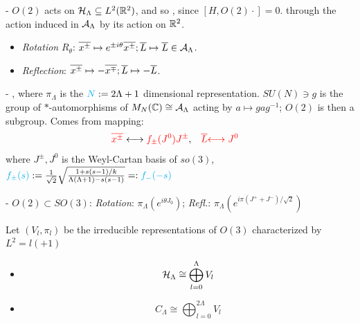 {
    \color{gray}
    
    - $O(2)$ acts on $\mathcal H_\Lambda \subseteq L^2(\mathbb{R}^2)$, and so , since $[H, O(2)\cdot ] = 0$. through the action induced in $\mathcal A_\Lambda$ by its action on $\mathbb{R}^2$.
        \begin{itemize}
            
        \item \textit{Rotation} $R_\theta$: $\overline{x^\pm} \mapsto e^{\pm i \theta} \overline{x ^\pm}; \overline{L} \mapsto \overline{L} \in \mathcal A_\Lambda$.
        
        \item \textit{Reflection}: $\overline{x^\pm} \mapsto -\overline{x^\mp}; \overline{L} \mapsto -\overline{L}$.
        
        \end{itemize}
    
    - , where $\pi_\Lambda$ is the $\textcolor{cyan}{N} := 2 \Lambda + 1$ dimensional representation. $SU(N) \ni g$ is the group of $*$-automorphisms of $M_N(\mathbb{C}) \cong \mathcal A_\Lambda$ acting by $a \mapsto g a g^{-1}$; $O(2)$ is then a subgroup. Comes from mapping:
    \begin{align}
        \textcolor{red}{\overline{x^\pm}} &\longleftrightarrow \textcolor{red}{f_\pm (J^0) J^\pm}, &
        \textcolor{red}{\overline{L} }& \textcolor{red}{\longleftrightarrow J^0}
    \end{align}
    where $J^\pm, J^0$ is the Weyl-Cartan basis of $so(3)$, $\textcolor{cyan}{f_\pm(s)} := \frac{1}{\sqrt{2}} \sqrt{\frac{1 + s(s-1)/k}{\Lambda (\Lambda + 1) - s(s-1)}} =: \textcolor{cyan}{f_-(-s)}$%

    - $O(2) \subset SO(3)$: \textit{Rotation}: $\pi_\Lambda(e^{i \theta J_0})$; \textit{Refl.}: $\pi_\Lambda(e^{i\pi (J^+ + J^-)/\sqrt{2}})$
    
    \lin 
    
    Let $(V_l, \pi_l)$ be the irreducible representations of $O(3)$ characterized by $L^2 = l(+1)$
    
        \begin{itemize}
        
        \item  \begin{equation}
            \mathcal H_\Lambda \cong \bigoplus_{l = 0}^\Lambda V_l
        \end{equation}
        
        \item \begin{equation}
            C_\Lambda \cong \bigoplus_{l = 0}^{2\Lambda} V_l
        \end{equation}
        
        \end{itemize}
        
}

